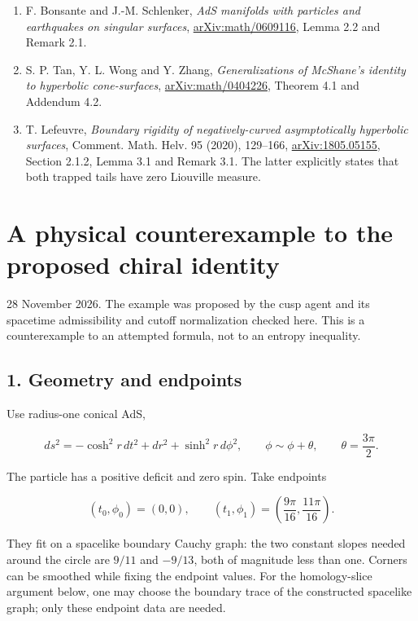\documentclass[11pt]{article}
\providecommand{\tightlist}{\setlength{\itemsep}{1pt}\setlength{\parskip}{0pt}}
\begin{document}
\begin{enumerate}
\def\labelenumi{\arabic{enumi}.}
\tightlist
\item
  F. Bonsante and J.-M. Schlenker, \emph{AdS manifolds with particles
  and earthquakes on singular surfaces},
  \href{https://arxiv.org/abs/math/0609116}{arXiv:math/0609116}, Lemma
  2.2 and Remark 2.1.
\item
  S. P. Tan, Y. L. Wong and Y. Zhang, \emph{Generalizations of McShane's
  identity to hyperbolic cone-surfaces},
  \href{https://arxiv.org/abs/math/0404226}{arXiv:math/0404226}, Theorem
  4.1 and Addendum 4.2.
\item
  T. Lefeuvre, \emph{Boundary rigidity of negatively-curved
  asymptotically hyperbolic surfaces}, Comment. Math. Helv. 95 (2020),
  129--166, \href{https://arxiv.org/abs/1805.05155}{arXiv:1805.05155},
  Section 2.1.2, Lemma 3.1 and Remark 3.1. The latter explicitly states
  that both trapped tails have zero Liouville measure.
\end{enumerate}

\clearpage

\section{A physical counterexample to the proposed chiral
identity}\label{a-physical-counterexample-to-the-proposed-chiral-identity}

28 November 2026. The example was proposed by the cusp agent and its
spacetime admissibility and cutoff normalization checked here. This is a
counterexample to an attempted formula, not to an entropy inequality.

\subsection{1. Geometry and endpoints}\label{geometry-and-endpoints}

Use radius-one conical AdS,

\[
 ds^2=-\cosh^2r\,dt^2+dr^2+\sinh^2r\,d\phi^2,
 \qquad \phi\sim\phi+\theta,\qquad\theta=\frac{3\pi}{2}.
\]

The particle has a positive deficit and zero spin. Take endpoints

\[
 (t_0,\phi_0)=(0,0),\qquad
 (t_1,\phi_1)=\left(\frac{9\pi}{16},\frac{11\pi}{16}\right).
\]

They fit on a spacelike boundary Cauchy graph: the two constant slopes
needed around the circle are \(9/11\) and \(-9/13\), both of magnitude
less than one. Corners can be smoothed while fixing the endpoint values.
For the homology-slice argument below, one may choose the boundary trace
of the constructed spacelike graph; only these endpoint data are needed.
\end{document}
